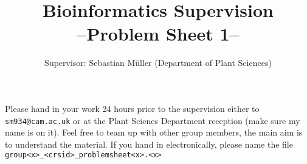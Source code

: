 \documentclass[11pt,runningheads,a4paper]{article}
\begin{document}

\title{{\LARGE Bioinformatics Supervision}\\
{\Large --Problem Sheet 1--}} 
\author{Supervisor: Sebastian Müller (Department of Plant Sciences)}
\date{}

\maketitle

Please hand in your work 24 hours prior to the supervision either to \texttt{sm934@cam.ac.uk} or at the Plant Scienes Department reception (make sure my name is on it). Feel free to team up with other group members, the main aim is to understand the material. If you hand in electronically, please name the file \texttt{group<x>\_<crsid>\_problemsheet<x>.<x>}
\end{document}

